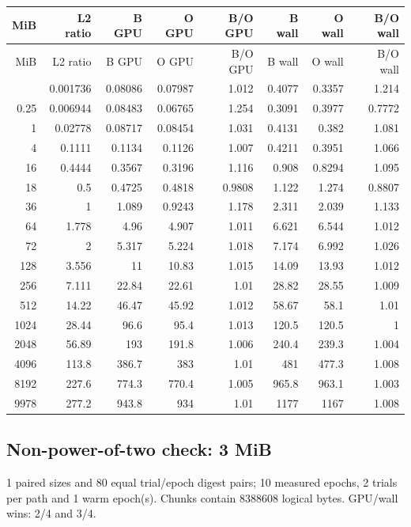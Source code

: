 \begingroup
\scriptsize
\setlength{\tabcolsep}{2.5pt}
\renewcommand{\arraystretch}{1.16}
\begin{longtable}{rrrrrrrr}
\toprule
MiB & L2 ratio & B GPU & O GPU & B/O GPU & B wall & O wall & B/O wall \\
\midrule\endfirsthead
\toprule
MiB & L2 ratio & B GPU & O GPU & B/O GPU & B wall & O wall & B/O wall \\
\midrule\endhead
\bottomrule\endfoot
0.0625 & 0.001736 & 0.08086 & 0.07987 & 1.012 & 0.4077 & 0.3357 & 1.214 \\
0.25 & 0.006944 & 0.08483 & 0.06765 & 1.254 & 0.3091 & 0.3977 & 0.7772 \\
1 & 0.02778 & 0.08717 & 0.08454 & 1.031 & 0.4131 & 0.382 & 1.081 \\
4 & 0.1111 & 0.1134 & 0.1126 & 1.007 & 0.4211 & 0.3951 & 1.066 \\
16 & 0.4444 & 0.3567 & 0.3196 & 1.116 & 0.908 & 0.8294 & 1.095 \\
18 & 0.5 & 0.4725 & 0.4818 & 0.9808 & 1.122 & 1.274 & 0.8807 \\
36 & 1 & 1.089 & 0.9243 & 1.178 & 2.311 & 2.039 & 1.133 \\
64 & 1.778 & 4.96 & 4.907 & 1.011 & 6.621 & 6.544 & 1.012 \\
72 & 2 & 5.317 & 5.224 & 1.018 & 7.174 & 6.992 & 1.026 \\
128 & 3.556 & 11 & 10.83 & 1.015 & 14.09 & 13.93 & 1.012 \\
256 & 7.111 & 22.84 & 22.61 & 1.01 & 28.82 & 28.55 & 1.009 \\
512 & 14.22 & 46.47 & 45.92 & 1.012 & 58.67 & 58.1 & 1.01 \\
1024 & 28.44 & 96.6 & 95.4 & 1.013 & 120.5 & 120.5 & 1 \\
2048 & 56.89 & 193 & 191.8 & 1.006 & 240.4 & 239.3 & 1.004 \\
4096 & 113.8 & 386.7 & 383 & 1.01 & 481 & 477.3 & 1.008 \\
8192 & 227.6 & 774.3 & 770.4 & 1.005 & 965.8 & 963.1 & 1.003 \\
9978 & 277.2 & 943.8 & 934 & 1.01 & 1177 & 1167 & 1.008 \\
\end{longtable}
\endgroup

\subsection{Non-power-of-two check: 3 MiB}

1 paired sizes and 80 equal trial/epoch digest pairs; 10 measured epochs, 2 trials per path and 1 warm epoch(s). Chunks contain 8388608 logical bytes. GPU/wall wins: 2/4 and 3/4.

